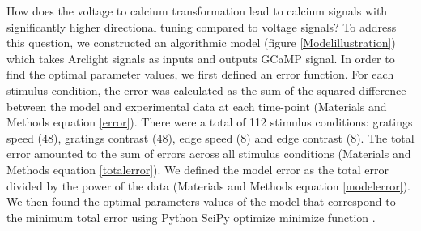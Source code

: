 \documentclass[9pt,lineno]{elife}
\begin{document}
How does the voltage to calcium transformation lead to calcium signals with significantly higher directional tuning compared to voltage signals? To address this question, we constructed an algorithmic model (figure \ref{Modelillustration}) which takes Arclight signals as inputs and outputs GCaMP signal. In order to find the optimal parameter values, we first defined an error function. For each stimulus condition, the error was calculated as the sum of the squared difference between the model and experimental data at each time-point (Materials and Methods equation \eqref{error}). There were a total of 112 stimulus conditions: gratings speed (48), gratings contrast (48), edge speed (8) and edge contrast (8). The total error amounted to the sum of errors across all stimulus conditions (Materials and Methods equation \eqref{totalerror}). We defined the model error as the total error divided by the power of the data (Materials and Methods equation \eqref{modelerror}). We then found the optimal parameters values of the model that correspond to the minimum total error using Python SciPy optimize minimize function \parencite{Virtanen2020}.
\end{document}
